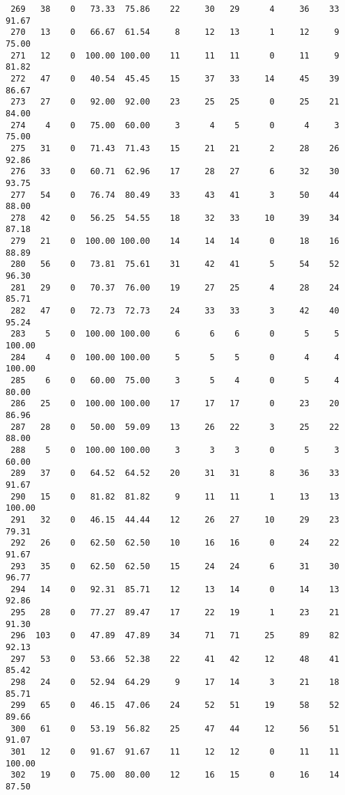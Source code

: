 \begin{verbatim}
 269   38    0   73.33  75.86    22     30   29      4     36    33    91.67
 270   13    0   66.67  61.54     8     12   13      1     12     9    75.00
 271   12    0  100.00 100.00    11     11   11      0     11     9    81.82
 272   47    0   40.54  45.45    15     37   33     14     45    39    86.67
 273   27    0   92.00  92.00    23     25   25      0     25    21    84.00
 274    4    0   75.00  60.00     3      4    5      0      4     3    75.00
 275   31    0   71.43  71.43    15     21   21      2     28    26    92.86
 276   33    0   60.71  62.96    17     28   27      6     32    30    93.75
 277   54    0   76.74  80.49    33     43   41      3     50    44    88.00
 278   42    0   56.25  54.55    18     32   33     10     39    34    87.18
 279   21    0  100.00 100.00    14     14   14      0     18    16    88.89
 280   56    0   73.81  75.61    31     42   41      5     54    52    96.30
 281   29    0   70.37  76.00    19     27   25      4     28    24    85.71
 282   47    0   72.73  72.73    24     33   33      3     42    40    95.24
 283    5    0  100.00 100.00     6      6    6      0      5     5   100.00
 284    4    0  100.00 100.00     5      5    5      0      4     4   100.00
 285    6    0   60.00  75.00     3      5    4      0      5     4    80.00
 286   25    0  100.00 100.00    17     17   17      0     23    20    86.96
 287   28    0   50.00  59.09    13     26   22      3     25    22    88.00
 288    5    0  100.00 100.00     3      3    3      0      5     3    60.00
 289   37    0   64.52  64.52    20     31   31      8     36    33    91.67
 290   15    0   81.82  81.82     9     11   11      1     13    13   100.00
 291   32    0   46.15  44.44    12     26   27     10     29    23    79.31
 292   26    0   62.50  62.50    10     16   16      0     24    22    91.67
 293   35    0   62.50  62.50    15     24   24      6     31    30    96.77
 294   14    0   92.31  85.71    12     13   14      0     14    13    92.86
 295   28    0   77.27  89.47    17     22   19      1     23    21    91.30
 296  103    0   47.89  47.89    34     71   71     25     89    82    92.13
 297   53    0   53.66  52.38    22     41   42     12     48    41    85.42
 298   24    0   52.94  64.29     9     17   14      3     21    18    85.71
 299   65    0   46.15  47.06    24     52   51     19     58    52    89.66
 300   61    0   53.19  56.82    25     47   44     12     56    51    91.07
 301   12    0   91.67  91.67    11     12   12      0     11    11   100.00
 302   19    0   75.00  80.00    12     16   15      0     16    14    87.50

\end{verbatim}
